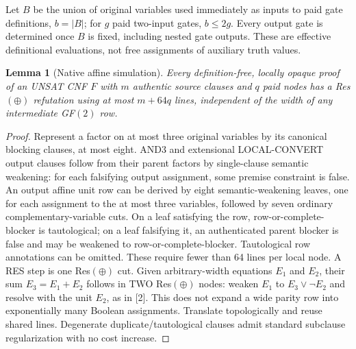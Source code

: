 \documentclass[11pt]{article}
\newtheorem{lemma}{Lemma}
\begin{document}
Let $B$ be the union of original variables used immediately as inputs to paid gate definitions, $b=|B|$; for $g$ paid two-input gates, $b\le2g$. Every output gate is determined once $B$ is fixed, including nested gate outputs. These are effective definitional evaluations, not free assignments of auxiliary truth values.

\begin{lemma}[Native affine simulation]\label{local}
Every definition-free, locally opaque proof of an UNSAT CNF $F$ with $m$ authentic source clauses and $q$ paid nodes has a Res$(\oplus)$ refutation using at most $m+64q$ lines, independent of the width of any intermediate GF$(2)$ row.
\end{lemma}
\begin{proof}
Represent a factor on at most three original variables by its canonical blocking clauses, at most eight. AND3 and extensional LOCAL-CONVERT output clauses follow from their parent factors by single-clause semantic weakening: for each falsifying output assignment, some premise constraint is false. An output affine unit row can be derived by eight semantic-weakening leaves, one for each assignment to the at most three variables, followed by seven ordinary complementary-variable cuts. On a leaf satisfying the row, row-or-complete-blocker is tautological; on a leaf falsifying it, an authenticated parent blocker is false and may be weakened to row-or-complete-blocker. Tautological row annotations can be omitted. These require fewer than 64 lines per local node. A RES step is one Res$(\oplus)$ cut. Given arbitrary-width equations $E_1$ and $E_2$, their sum $E_3=E_1+E_2$ follows in TWO Res$(\oplus)$ nodes: weaken $E_1$ to $E_3\vee\neg E_2$ and resolve with the unit $E_2$, as in [2]. This does not expand a wide parity row into exponentially many Boolean assignments. Translate topologically and reuse shared lines. Degenerate duplicate/tautological clauses admit standard subclause regularization with no cost increase.
\end{proof}
\end{document}
